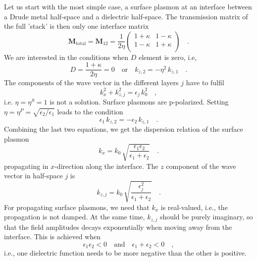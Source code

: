 Let us start with the most simple case, a surface plasmon at an interface between a Drude metal half-space and a dielectric half-space. The transmission matrix of the full 'stack' is then only one interface matrix
\begin{equation}
\mathbf{M}_\text{total} = \mathbf{M}_{12} =\frac{ 1}{2 \eta }
\begin{pmatrix}
1 + \kappa & 1  -\kappa \\  1  - \kappa  & 1 + \kappa \\
\end{pmatrix}  \quad .
\end{equation}
We are interested in the conditions when  $D$ element is zero, i.e,
\begin{equation}
D = \frac{1 + \kappa}{2 \eta} = 0 \quad \text{or} \quad
k_{z,2} = - \eta^2 \, k_{z,1} \quad .
\end{equation}
The components of the wave vector in the different layers $j$ have to fulfil
\begin{equation}
 k_x^2 + k_{z, j}^2 = \epsilon_j \, k_0^2 \quad , 
\end{equation}
i.e. $\eta = \eta^S = 1$ is not a solution. Surface plasmons are p-polarized. Setting $\eta = \eta^P = \sqrt{\epsilon_2 / \epsilon_1}$  leads to the condition
\begin{equation}
\epsilon_1 \, k_{z,2} = - \epsilon_2 \, k_{z,1} \quad . \label{eq:surface_spp_condition_kz}
\end{equation}
Combining the last two equations, we get the dispersion relation of the surface plasmon
\begin{equation}
k_x = k_0 \, \sqrt{\frac{\epsilon_1 \epsilon_2}{\epsilon_1 + \epsilon_2}} \quad . \label{eq:surface_spp_dispersion}
\end{equation}
propagating in $x$-direction along the interface. The $z$ component of the wave vector in half-space $j$ is
\begin{equation}
k_{z,j} = k_0 \, \sqrt{\frac{\epsilon_j^2}{\epsilon_1 + \epsilon_2}} \quad .
\end{equation}
For propagating surface plasmons, we need that $k_x$ is real-valued, i.e., the propagation is not damped. At the same time, $k_{z,j}$ should be purely imaginary, so that the field amplitudes decays exponentially when moving away from the interface. This is achieved when
\begin{equation}
 \epsilon_1 \epsilon_2 < 0 \quad \text{and} \quad 
  \epsilon_1 + \epsilon_2 < 0 \quad,
\end{equation}
i.e., one dielectric function needs to be more negative than the other is positive.


